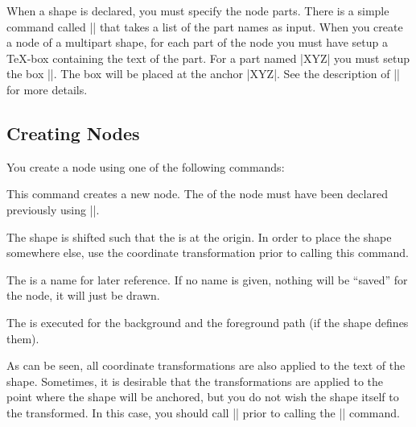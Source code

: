When a shape is declared, you must specify the node parts. There is a
simple command called |\nodeparts| that takes a list of the part names
as input. When you create a node of a multipart shape, for each part
of the node you must have setup a \TeX-box containing the text of the
part. For a part named |XYZ| you must setup the box
|\pgfnodepartXYZbox|. The box will be placed at the anchor |XYZ|. See
the description of |\pgfmultipartnode| for more details.


\subsection{Creating Nodes}

You create a node using one of the following commands:

\begin{command}{\pgfnode{}} 
  This command creates a new node. The  of the node must
  have been declared previously using |\pgfdeclareshape|.

  The shape is shifted such that the  is at the
  origin. In order to place the shape somewhere else, use the
  coordinate transformation prior to calling this command.

  The  is a name for later reference. If no name is given,
  nothing will be ``saved'' for the node, it will just be drawn.

  The  is executed for the background and the
  foreground path (if the shape defines them).

\begin{codeexample}[]
\end{codeexample}

  As can be seen, all coordinate transformations are also applied to
  the text of the shape. Sometimes, it is desirable that the
  transformations are applied to the point where the shape will be
  anchored, but you do not wish the shape itself to the
  transformed. In this case, you should call
  |\pgftransformresetnontranslations| prior to calling the |\pgfnode|
  command. 


\end{command}
